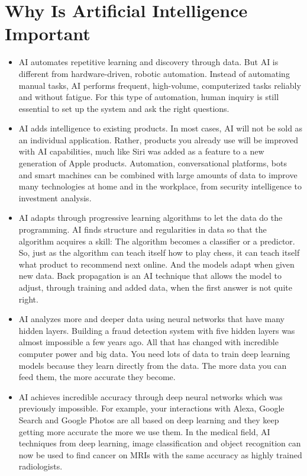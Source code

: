 \documentclass[a4paper, 12pt]{article}
\begin{document}
\section{Why Is Artificial Intelligence Important}
\begin{itemize}
\renewcommand{\labelitemi}{$\star$}
\item AI automates repetitive learning and discovery through data. But AI is different from hardware-driven, robotic automation. Instead of automating manual tasks, AI performs frequent, high-volume, computerized tasks reliably and without fatigue. For this type of automation, human inquiry is still essential to set up the system and ask the right questions.

\item AI adds intelligence to existing products. In most cases, AI will not be sold as an individual application. Rather, products you already use will be improved with AI capabilities, much like Siri was added as a feature to a new generation of Apple products. Automation, conversational platforms, bots and smart machines can be combined with large amounts of data to improve many technologies at home and in the workplace, from security intelligence to investment analysis.

\item AI adapts through progressive learning algorithms to let the data do the programming. AI finds structure and regularities in data so that the algorithm acquires a skill: The algorithm becomes a classifier or a predictor. So, just as the algorithm can teach itself how to play chess, it can teach itself what product to recommend next online. And the models adapt when given new data. Back propagation is an AI technique that allows the model to adjust, through training and added data, when the first answer is not quite right.

\item AI analyzes more and deeper data using neural networks that have many hidden layers. Building a fraud detection system with five hidden layers was almost impossible a few years ago. All that has changed with incredible computer power and big data. You need lots of data to train deep learning models because they learn directly from the data. The more data you can feed them, the more accurate they become.

\item AI achieves incredible accuracy through deep neural networks which was previously impossible. For example, your interactions with Alexa, Google Search and Google Photos are all based on deep learning and they keep getting more accurate the more we use them. In the medical field, AI techniques from deep learning, image classification and object recognition can now be used to find cancer on MRIs with the same accuracy as highly trained radiologists.


\end{itemize}
\end{document}
